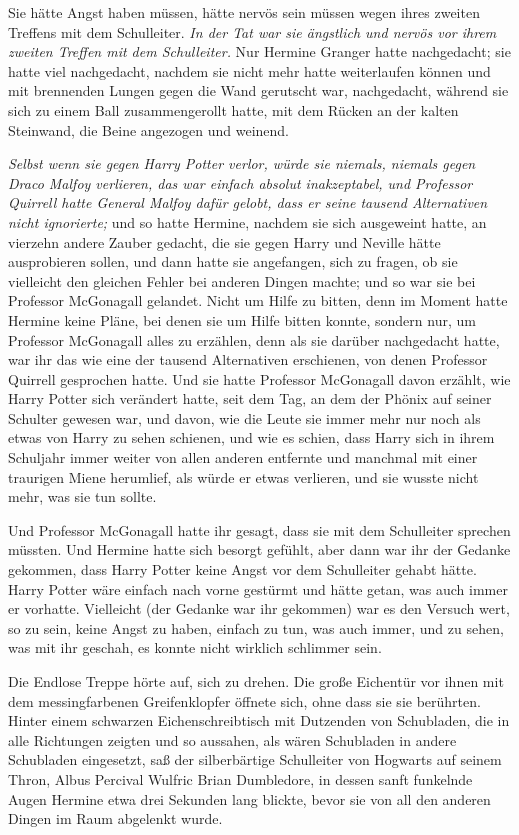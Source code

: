 {Sie hätte Angst haben müssen, hätte nervös sein müssen wegen ihres zweiten Treffens mit dem Schulleiter. \emph{In der Tat war sie ängstlich und nervös vor ihrem zweiten Treffen mit dem Schulleiter.} Nur Hermine Granger hatte nachgedacht; sie hatte viel nachgedacht, nachdem sie nicht mehr hatte weiterlaufen können und mit brennenden Lungen gegen die Wand gerutscht war, nachgedacht, während sie sich zu einem Ball zusammengerollt hatte, mit dem Rücken an der kalten Steinwand, die Beine angezogen und weinend.

\emph{Selbst wenn sie gegen Harry Potter verlor, würde sie niemals, niemals gegen Draco Malfoy verlieren, das war einfach absolut inakzeptabel, und Professor Quirrell hatte General Malfoy dafür gelobt, dass er seine tausend Alternativen nicht ignorierte;} und so hatte Hermine, nachdem sie sich ausgeweint hatte, an vierzehn andere Zauber gedacht, die sie gegen Harry und Neville hätte ausprobieren sollen, und dann hatte sie angefangen, sich zu fragen, ob sie vielleicht den gleichen Fehler bei anderen Dingen machte; und so war sie bei Professor McGonagall gelandet. Nicht um Hilfe zu bitten, denn im Moment hatte Hermine keine Pläne, bei denen sie um Hilfe bitten konnte, sondern nur, um Professor McGonagall alles zu erzählen, denn als sie darüber nachgedacht hatte, war ihr das wie eine der tausend Alternativen erschienen, von denen Professor Quirrell gesprochen hatte. Und sie hatte Professor McGonagall davon erzählt, wie Harry Potter sich verändert hatte, seit dem Tag, an dem der Phönix auf seiner Schulter gewesen war, und davon, wie die Leute sie immer mehr nur noch als etwas von Harry zu sehen schienen, und wie es schien, dass Harry sich in ihrem Schuljahr immer weiter von allen anderen entfernte und manchmal mit einer traurigen Miene herumlief, als würde er etwas verlieren, und sie wusste nicht mehr, was sie tun sollte.

Und Professor McGonagall hatte ihr gesagt, dass sie mit dem Schulleiter sprechen müssten. Und Hermine hatte sich besorgt gefühlt, aber dann war ihr der Gedanke gekommen, dass Harry Potter keine Angst vor dem Schulleiter gehabt hätte. Harry Potter wäre einfach nach vorne gestürmt und hätte getan, was auch immer er vorhatte. Vielleicht (der Gedanke war ihr gekommen) war es den Versuch wert, so zu sein, keine Angst zu haben, einfach zu tun, was auch immer, und zu sehen, was mit ihr geschah, es konnte nicht wirklich schlimmer sein.

Die Endlose Treppe hörte auf, sich zu drehen. Die große Eichentür vor ihnen mit dem messingfarbenen Greifenklopfer öffnete sich, ohne dass sie sie berührten. Hinter einem schwarzen Eichenschreibtisch mit Dutzenden von Schubladen, die in alle Richtungen zeigten und so aussahen, als wären Schubladen in andere Schubladen eingesetzt, saß der silberbärtige Schulleiter von Hogwarts auf seinem Thron, Albus Percival Wulfric Brian Dumbledore, in dessen sanft funkelnde Augen Hermine etwa drei Sekunden lang blickte, bevor sie von all den anderen Dingen im Raum abgelenkt wurde.

}
